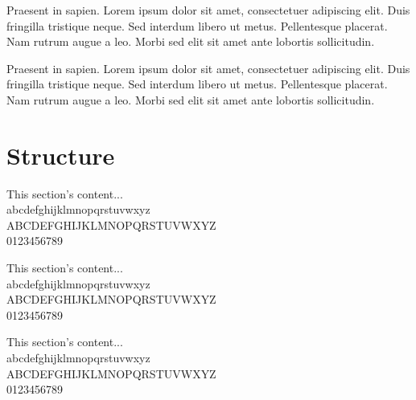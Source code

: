 \documentclass[a5paper,12pt,draft]{book} %
\begin{document}
Praesent in sapien. Lorem ipsum dolor sit amet, consectetuer adipiscing elit.
Duis fringilla tristique neque. Sed interdum libero ut metus. Pellentesque placerat.
Nam rutrum augue a leo. Morbi sed elit sit amet ante lobortis sollicitudin.

Praesent in sapien. Lorem ipsum dolor sit amet, consectetuer adipiscing elit.
Duis fringilla tristique neque. Sed interdum libero ut metus. Pellentesque placerat.
Nam rutrum augue a leo. Morbi sed elit sit amet ante lobortis sollicitudin.

\section*{Structure}
\indent
\small{This section's content... \\
abcdefghijklmnopqrstuvwxyz \\
ABCDEFGHIJKLMNOPQRSTUVWXYZ \\
0123456789}

\tiny{This section's content... \\
abcdefghijklmnopqrstuvwxyz \\
ABCDEFGHIJKLMNOPQRSTUVWXYZ \\
0123456789}

\normalsize{This section's content... \\
abcdefghijklmnopqrstuvwxyz \\
ABCDEFGHIJKLMNOPQRSTUVWXYZ \\
0123456789}

\clearpage

\vspace*{0.1\textheight}
\clearpage

\listoffigures

\listoftables

\tableofcontents
\clearpage
\end{document}
